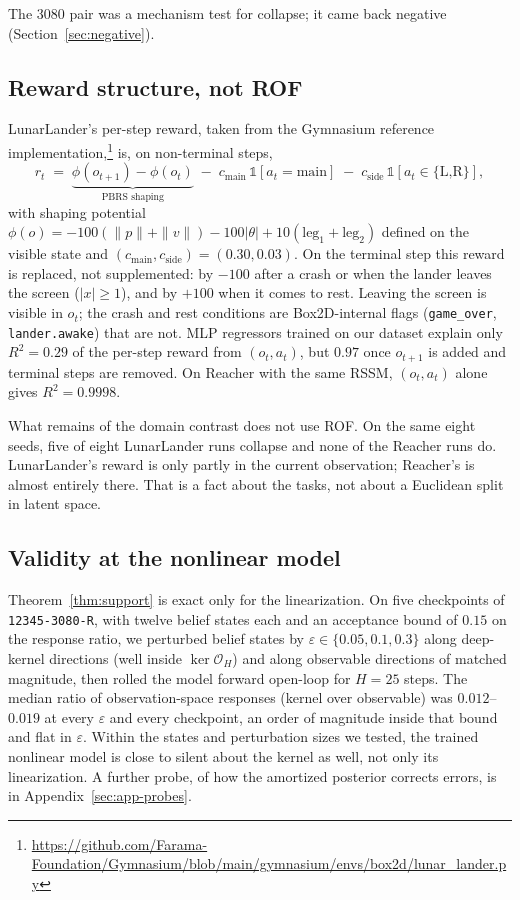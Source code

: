 \documentclass[11pt]{article}
\theoremstyle{remark}
\begin{document}
The 3080 pair was a mechanism test for collapse; it came back negative (Section~\ref{sec:negative}).

\subsection{Reward structure, not ROF}
\label{sec:reward-predictability}
\label{sec:domain}

LunarLander's per-step reward, taken from the Gymnasium reference implementation,\footnote{\url{https://github.com/Farama-Foundation/Gymnasium/blob/main/gymnasium/envs/box2d/lunar_lander.py}} is, on non-terminal steps,
\begin{equation}
r_t \;=\; \underbrace{\phi(o_{t+1}) - \phi(o_t)}_{\text{PBRS shaping}} \;-\; c_{\text{main}}\, \mathbb{1}[a_t{=}\text{main}] \;-\; c_{\text{side}}\, \mathbb{1}[a_t{\in}\{\text{L,R}\}],
\label{eq:lander-reward}
\end{equation}
with shaping potential $\phi(o) = -100(\|p\|+\|v\|) - 100|\theta| + 10(\text{leg}_1+\text{leg}_2)$ defined on the visible state and $(c_{\text{main}}, c_{\text{side}}) = (0.30, 0.03)$. On the terminal step this reward is replaced, not supplemented: by $-100$ after a crash or when the lander leaves the screen ($|x| \ge 1$), and by $+100$ when it comes to rest. Leaving the screen is visible in $o_t$; the crash and rest conditions are Box2D-internal flags (\texttt{game\_over}, \texttt{lander.awake}) that are not. MLP regressors trained on our dataset explain only $R^2{=}0.29$ of the per-step reward from $(o_t, a_t)$, but $0.97$ once $o_{t+1}$ is added and terminal steps are removed. On Reacher with the same RSSM, $(o_t, a_t)$ alone gives $R^2{=}0.9998$.

What remains of the domain contrast does not use ROF. On the same eight seeds, five of eight LunarLander runs collapse and none of the Reacher runs do. LunarLander's reward is only partly in the current observation; Reacher's is almost entirely there. That is a fact about the tasks, not about a Euclidean split in latent space.

\subsection{Validity at the nonlinear model}
\label{sec:nonlinear}

Theorem~\ref{thm:support} is exact only for the linearization. On five checkpoints of \texttt{12345-3080-R}, with twelve belief states each and an acceptance bound of $0.15$ on the response ratio, we perturbed belief states by $\varepsilon \in \{0.05, 0.1, 0.3\}$ along deep-kernel directions (well inside $\ker \mathcal{O}_H$) and along observable directions of matched magnitude, then rolled the model forward open-loop for $H{=}25$ steps. The median ratio of observation-space responses (kernel over observable) was $0.012$--$0.019$ at every $\varepsilon$ and every checkpoint, an order of magnitude inside that bound and flat in $\varepsilon$. Within the states and perturbation sizes we tested, the trained nonlinear model is close to silent about the kernel as well, not only its linearization. A further probe, of how the amortized posterior corrects errors, is in Appendix~\ref{sec:app-probes}.
\end{document}
